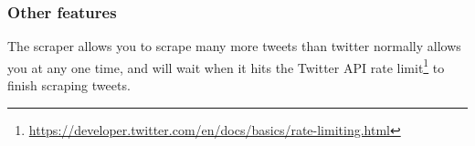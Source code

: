 \documentclass{article}
\begin{document}
\subsubsection{Other features}

The scraper allows you to scrape many more tweets than twitter normally allows you at any one time, and will wait when it hits the Twitter API rate limit\footnote{\url{https://developer.twitter.com/en/docs/basics/rate-limiting.html}} to finish scraping tweets.




%
%
\end{document}
